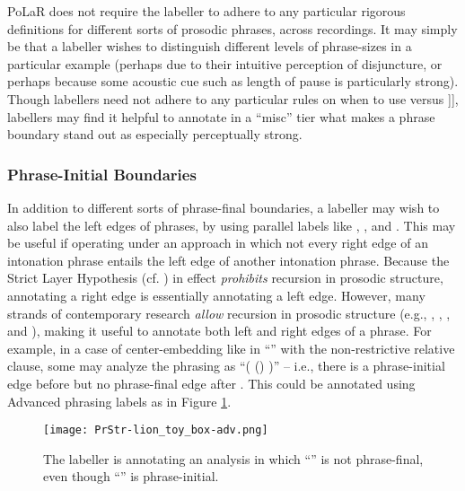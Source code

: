 PoLaR does not require the labeller to adhere to any particular rigorous definitions for different sorts of prosodic phrases, across recordings. It may simply be that a labeller wishes to distinguish different levels of phrase-sizes in a particular example (perhaps due to their intuitive perception of disjuncture, or perhaps because some acoustic cue such as length of pause is particularly strong). Though labellers need not adhere to any particular rules on when to use \textlabel{]} versus {]]}, labellers may find it helpful to annotate in a “misc” tier what makes a \textlabel{]]} phrase boundary stand out as especially perceptually strong.

\subsubsection{Phrase-Initial Boundaries}\label{sec:phrase-initial-boundaries}

In addition to different sorts of phrase-final boundaries, a labeller may wish to also label the left edges of phrases, by using parallel labels like \textlabel{[}, \textlabel{?[}, and \textlabel{[[}. This may be useful if operating under an approach in which not every right edge of an intonation phrase entails the left edge of another intonation phrase. Because the Strict Layer Hypothesis (cf. \citealt{nesporvogel86}) in effect \textit{prohibits} recursion in prosodic structure, annotating a right edge is essentially annotating a left edge. However, many strands of contemporary research \textit{allow} recursion in prosodic structure (e.g., \citealt{ladd08}, \citealt{selkirk11}, \citealt{itomester12}, and \citealt{kentnerfery13}), making it useful to annotate both left and right edges of a phrase. For example, in a case of center-embedding like in “” with the non-restrictive relative clause, some may analyze the phrasing as “( () )” – i.e., there is a phrase-initial edge before  but no phrase-final edge after . This could be annotated using Advanced phrasing labels as in Figure \ref{fig:lion toy box PrStr Adv}.

\begin{figure}[H]
\centering
%
\texttt{[image: PrStr-lion\_toy\_box-adv.png]}
%
\caption{The labeller is annotating an analysis in which “” is not phrase-final, even though “” is phrase-initial.%
\label{fig:lion toy box PrStr Adv}%
}
\end{figure}

